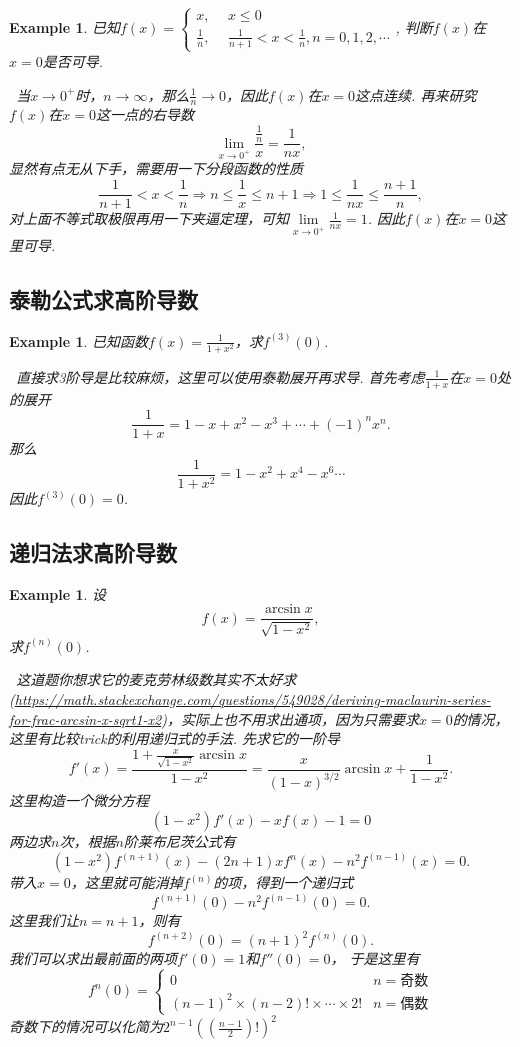 \documentclass{article}
\newtheorem{example}[theorem]{Example}
\newcommand{\hints}{{\color{blue} \text{hints}}}
\begin{document}
\begin{example}
\rm 已知$f(x) = \left\{ \begin{aligned} x, ~&~ x\leq 0 \\ \frac{1}{n},~ &~ \frac{1}{n+1} < x < \frac{1}{n}, n = 0,1,2,\cdots \end{aligned} \right.$, 判断$f(x)$在$x=0$是否可导. 

\hints\ 当$x \to 0^+$时，$n \to \infty$，那么$\frac{1}{n} \to 0$，因此$f(x)$在$x=0$这点连续. 再来研究$f(x)$在$x=0$这一点的右导数
$$
\lim\limits_{x \to 0^+} \frac{\frac{1}{n}}{x} = \frac{1}{nx},
$$
显然有点无从下手，需要用一下分段函数的性质
$$
\frac{1}{n+1} < x < \frac{1}{n} \Rightarrow n \leq \frac{1}{x} \leq n+1 \Rightarrow 1 \leq \frac{1}{nx} \leq \frac{n+1}{n},
$$
对上面不等式取极限再用一下夹逼定理，可知$\lim\limits_{x \to 0^+} \frac{1}{nx} = 1$. 因此$f(x)$在$x=0$这里可导. 
\end{example}

\subsection{泰勒公式求高阶导数}

\begin{example}
\rm 已知函数$f(x)=\frac{1}{1+x^2}$，求$f^{(3)}(0)$.

\hints\ 直接求3阶导是比较麻烦，这里可以使用泰勒展开再求导. 首先考虑$\frac{1}{1+x}$在$x=0$处的展开
$$
\frac{1}{1+x} = 1 - x + x^2 - x^3 + \cdots + (-1)^n x^n.
$$
那么
$$
\frac{1}{1+x^2} = 1 - x^2 + x^4 - x^6 \cdots 
$$
因此$f^{(3)}(0) = 0$. 
\end{example}

\subsection{递归法求高阶导数}

\begin{example}
\rm 设
$$
f(x) = \frac{\arcsin x}{\sqrt{1-x^2}},
$$
求$f^{(n)}(0)$.

\hints\ 这道题你想求它的麦克劳林级数其实不太好求(\url{https://math.stackexchange.com/questions/549028/deriving-maclaurin-series-for-frac-arcsin-x-sqrt1-x2})，实际上也不用求出通项，因为只需要求$x=0$的情况，这里有比较trick的利用递归式的手法. 先求它的一阶导
$$
f'(x) = \frac{1 + \frac{x}{\sqrt{1-x^2}}\arcsin x}{1-x^2} = \frac{x}{(1-x)^{3/2}}\arcsin x + \frac{1}{1-x^2}.  
$$
这里构造一个微分方程
$$
(1-x^2)f'(x)-xf(x)-1 = 0
$$ 
两边求$n$次，根据$n$阶莱布尼茨公式有
$$
(1-x^2)f^{(n+1)}(x) - (2n+1)xf^{n}(x)-n^2f^{(n-1)}(x) = 0. 
$$
带入$x=0$，这里就可能消掉$f^{(n)}$的项，得到一个递归式
$$
f^{(n+1)}(0) - n^2f^{(n-1)}(0) = 0. 
$$
这里我们让$n=n+1$，则有
$$
f^{(n+2)}(0) =  (n+1)^2f^{(n)}(0). 
$$
我们可以求出最前面的两项$f'(0) = 1$和$f''(0) = 0$， 于是这里有
$$
f^{n}(0) = \left\{ \begin{array}{ll}
0 & n=\text{奇数} \\
(n-1)^2\times(n-2)!\times\cdots\times 2! &   n=\text{偶数}
\end{array} \right.
$$
奇数下的情况可以化简为$2^{n-1}((\frac{n-1}{2})!)^2$
\end{example}
\end{document}
